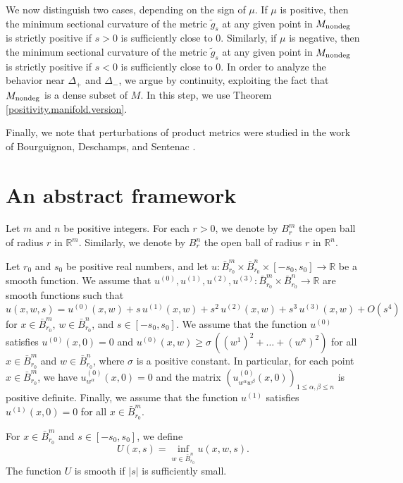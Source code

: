 \documentclass[11pt]{amsart}
\theoremstyle{definition}
\begin{document}
We now distinguish two cases, depending on the sign of $\mu$. If $\mu$ is positive, then the minimum sectional curvature of the metric $\tilde{g}_s$ at any given point in $M_{\text{\rm nondeg}}$ is strictly positive if $s > 0$ is sufficiently close to $0$. Similarly, if $\mu$ is negative, then the minimum sectional curvature of the metric $\tilde{g}_s$ at any given point in $M_{\text{\rm nondeg}}$ is strictly positive if $s < 0$ is sufficiently close to $0$. In order to analyze the behavior near $\Delta_+$ and $\Delta_-$, we argue by continuity, exploiting the fact that $M_{\text{\rm nondeg}}$ is a dense subset of $M$. In this step, we use Theorem \ref{positivity.manifold.version}.

Finally, we note that perturbations of product metrics were studied in the work of Bourguignon, Deschamps, and Sentenac \cite{Bourguignon-Deschamps-Sentenac}.

\section{An abstract framework}\label{framework}

Let $m$ and $n$ be positive integers. For each $r>0$, we denote by $B_r^m$ the open ball of radius $r$ in $\mathbb{R}^m$. Similarly, we denote by $B_r^n$ the open ball of radius $r$ in $\mathbb{R}^n$. 

Let $r_0$ and $s_0$ be positive real numbers, and let $u: \bar{B}_{r_0}^m \times \bar{B}_{r_0}^n \times [-s_0,s_0] \to \mathbb{R}$ be a smooth function. We assume that $u^{(0)},u^{(1)},u^{(2)},u^{(3)}: \bar{B}_{r_0}^m \times \bar{B}_{r_0}^n \to \mathbb{R}$ are smooth functions such that 
\[u(x,w,s) = u^{(0)}(x,w) + s \, u^{(1)}(x,w) + s^2 \, u^{(2)}(x,w) + s^3 \, u^{(3)}(x,w) + O(s^4)\] 
for $x \in \bar{B}_{r_0}^m$, $w \in \bar{B}_{r_0}^n$, and $s \in [-s_0,s_0]$. We assume that the function $u^{(0)}$ satisfies $u^{(0)}(x,0) = 0$ and $u^{(0)}(x,w) \geq \sigma \, ((w^1)^2+\hdots+(w^n)^2)$ for all $x \in \bar{B}_{r_0}^m$ and $w \in \bar{B}_{r_0}^n$, where $\sigma$ is a positive constant. In particular, for each point $x \in \bar{B}_{r_0}^m$, we have $u^{(0)}_{w^\alpha}(x,0) = 0$ and the matrix $(u^{(0)}_{w^\alpha w^\beta}(x,0))_{1 \leq \alpha,\beta \leq n}$ is positive definite. Finally, we assume that the function $u^{(1)}$ satisfies $u^{(1)}(x,0) = 0$ for all $x \in \bar{B}_{r_0}^m$.

For $x \in \bar{B}_{r_0}^m$ and $s \in [-s_0,s_0]$, we define 
\[U(x,s) = \inf_{w \in \bar{B}_{r_0}^n} u(x,w,s).\] 
The function $U$ is smooth if $|s|$ is sufficiently small. 
\end{document}
